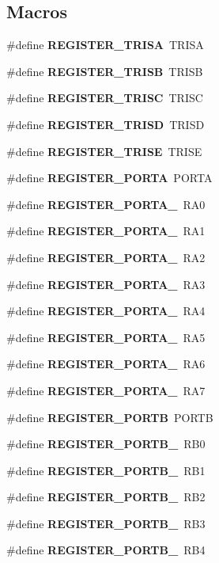 \subsection*{Macros}
\begin{DoxyCompactItemize}
\item 
\#define {\bf R\-E\-G\-I\-S\-T\-E\-R\-\_\-\-T\-R\-I\-S\-A}~T\-R\-I\-S\-A
\item 
\#define {\bf R\-E\-G\-I\-S\-T\-E\-R\-\_\-\-T\-R\-I\-S\-B}~T\-R\-I\-S\-B
\item 
\#define {\bf R\-E\-G\-I\-S\-T\-E\-R\-\_\-\-T\-R\-I\-S\-C}~T\-R\-I\-S\-C
\item 
\#define {\bf R\-E\-G\-I\-S\-T\-E\-R\-\_\-\-T\-R\-I\-S\-D}~T\-R\-I\-S\-D
\item 
\#define {\bf R\-E\-G\-I\-S\-T\-E\-R\-\_\-\-T\-R\-I\-S\-E}~T\-R\-I\-S\-E
\item 
\#define {\bf R\-E\-G\-I\-S\-T\-E\-R\-\_\-\-P\-O\-R\-T\-A}~P\-O\-R\-T\-A
\item 
\#define {\bf R\-E\-G\-I\-S\-T\-E\-R\-\_\-\-P\-O\-R\-T\-A\-\_}~R\-A0
\item 
\#define {\bf R\-E\-G\-I\-S\-T\-E\-R\-\_\-\-P\-O\-R\-T\-A\-\_}~R\-A1
\item 
\#define {\bf R\-E\-G\-I\-S\-T\-E\-R\-\_\-\-P\-O\-R\-T\-A\-\_}~R\-A2
\item 
\#define {\bf R\-E\-G\-I\-S\-T\-E\-R\-\_\-\-P\-O\-R\-T\-A\-\_}~R\-A3
\item 
\#define {\bf R\-E\-G\-I\-S\-T\-E\-R\-\_\-\-P\-O\-R\-T\-A\-\_}~R\-A4
\item 
\#define {\bf R\-E\-G\-I\-S\-T\-E\-R\-\_\-\-P\-O\-R\-T\-A\-\_}~R\-A5
\item 
\#define {\bf R\-E\-G\-I\-S\-T\-E\-R\-\_\-\-P\-O\-R\-T\-A\-\_}~R\-A6
\item 
\#define {\bf R\-E\-G\-I\-S\-T\-E\-R\-\_\-\-P\-O\-R\-T\-A\-\_}~R\-A7
\item 
\#define {\bf R\-E\-G\-I\-S\-T\-E\-R\-\_\-\-P\-O\-R\-T\-B}~P\-O\-R\-T\-B
\item 
\#define {\bf R\-E\-G\-I\-S\-T\-E\-R\-\_\-\-P\-O\-R\-T\-B\-\_}~R\-B0
\item 
\#define {\bf R\-E\-G\-I\-S\-T\-E\-R\-\_\-\-P\-O\-R\-T\-B\-\_}~R\-B1
\item 
\#define {\bf R\-E\-G\-I\-S\-T\-E\-R\-\_\-\-P\-O\-R\-T\-B\-\_}~R\-B2
\item 
\#define {\bf R\-E\-G\-I\-S\-T\-E\-R\-\_\-\-P\-O\-R\-T\-B\-\_}~R\-B3
\item 
\#define {\bf R\-E\-G\-I\-S\-T\-E\-R\-\_\-\-P\-O\-R\-T\-B\-\_}~R\-B4

\end{DoxyCompactItemize}
